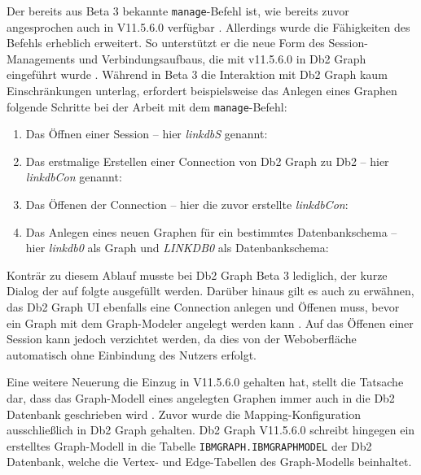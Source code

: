
Der bereits aus Beta 3 bekannte \texttt{manage}-Befehl ist, wie bereits zuvor angesprochen auch in V11.5.6.0 verfügbar \cite{ibm_docs_db2_graph_commands}. Allerdings wurde die Fähigkeiten des Befehls erheblich erweitert. So unterstützt er die neue Form des Session-Managements und Verbindungsaufbaus, die mit v11.5.6.0 in Db2 Graph eingeführt wurde \cite{ibm_docs_db2_graph_commands}. Während in Beta 3 die Interaktion mit Db2 Graph kaum Einschränkungen unterlag, erfordert beispielsweise das Anlegen eines Graphen folgende Schritte bei der Arbeit mit dem \texttt{manage}-Befehl:

\begin{enumerate}
    \item Das Öffnen einer Session -- hier \textit{linkdbS} genannt:\\
    \item Das erstmalige Erstellen einer Connection von Db2 Graph zu Db2 -- hier \textit{linkdbCon} genannt:\\
    \item Das Öffenen der Connection -- hier die zuvor erstellte \textit{linkdbCon}:\\
    \item Das Anlegen eines neuen Graphen für ein bestimmtes Datenbankschema -- hier \textit{linkdb0} als Graph und \textit{LINKDB0} als Datenbankschema:\\ 
\end{enumerate}

Konträr zu diesem Ablauf musste bei Db2 Graph Beta 3 lediglich, der kurze Dialog der auf  folgte ausgefüllt werden. Darüber hinaus gilt es auch zu erwähnen, das Db2 Graph UI ebenfalls eine Connection anlegen und Öffenen muss, bevor ein Graph mit dem Graph-Modeler angelegt werden kann \cite{ibm_docs_db2_graph_ui}. Auf das Öffenen einer Session kann jedoch verzichtet werden, da dies von der Weboberfläche automatisch ohne Einbindung des Nutzers erfolgt.

Eine weitere Neuerung die Einzug in V11.5.6.0 gehalten hat, stellt die Tatsache dar, dass das Graph-Modell eines angelegten Graphen immer auch in die Db2 Datenbank geschrieben wird \cite{ibm_docs_privileges}. Zuvor wurde die Mapping-Konfiguration ausschließlich in Db2 Graph gehalten. Db2 Graph V11.5.6.0 schreibt hingegen ein erstelltes Graph-Modell in die Tabelle \texttt{IBMGRAPH.IBMGRAPHMODEL} der Db2 Datenbank, welche die Vertex- und Edge-Tabellen des Graph-Modells beinhaltet. 